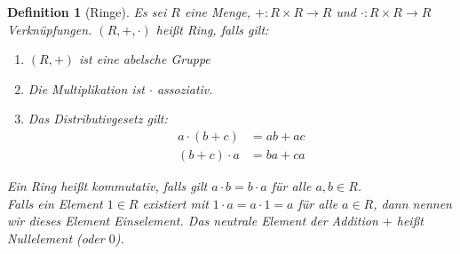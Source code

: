 \documentclass{report}
\newcommand{\IN}[1]{\index{#1|BH}}
\theoremstyle{customrem}
\theoremstyle{customdef}
\newtheorem{definition}{Definition}[chapter]
\begin{document}
	\begin{definition}[Ringe]
		\IN{Ring}
		Es sei \(R\) eine Menge, \(+ : R \times R \to R\) und \(\cdot : R \times R \to R\) Verknüpfungen. \((R, +, \cdot)\) heißt Ring, falls gilt:
		\begin{enumerate}
			\item \((R, +)\) ist eine abelsche Gruppe
			\item Die Multiplikation ist \(\cdot\) assoziativ.
			\item Das Distributivgesetz gilt:
			\begin{align*}
			a \cdot (b + c) &= ab + ac\\
			(b + c) \cdot a &= ba + ca
			\end{align*}
		\end{enumerate}
		Ein Ring heißt kommutativ, falls gilt \(a \cdot b = b \cdot a\) für alle \(a, b \in R\).\\
		Falls ein Element \(1 \in R\) existiert mit \(1 \cdot a = a \cdot 1 = a\) für alle \(a \in R\), dann nennen wir dieses Element Einselement.
		Das neutrale Element der Addition \(+\) heißt Nullelement (oder \(0\)).
	\end{definition}
	
\end{document}
